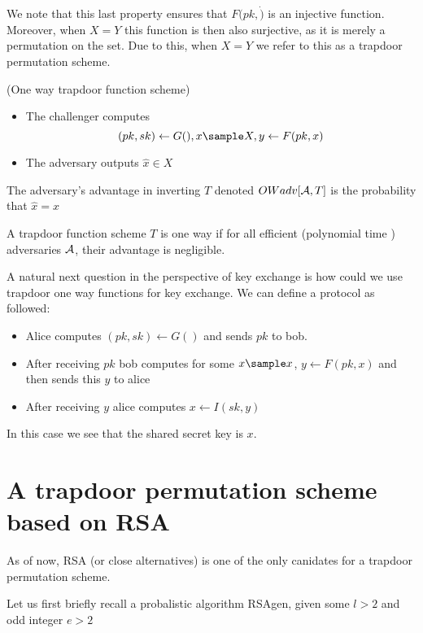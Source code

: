We note that this last property ensures that \(F(pk, \dot )\) is an injective function.  Moreover, when \(X=Y\) this function is then also surjective, as it is merely a permutation on the set. Due to this, when \(X=Y\) we refer to this as a trapdoor permutation scheme. 

\begin{attackGame} (One way trapdoor function scheme)
    \begin{itemize}
    \item The challenger computes 
    \[
        (pk, sk) \gets G(), x \sample X, y \gets F(pk, x)
    \] 
    \item The adversary outputs \(\hat{x} \in X\)
 
    \end{itemize}
    The adversary's advantage in inverting \(T\) denoted \(OWadv[\mathcal{A}, T]\) is the probability that \(\hat{x} = x\)    
\end{attackGame}

\begin{definition}
    A trapdoor function scheme \(T\) is one way if for all efficient (polynomial time ) adversaries \(\mathcal{A}\), their advantage is negligible.    
\end{definition}

A natural next question in the perspective of key exchange is how could we use trapdoor one way functions for key exchange. We can define a protocol as followed:
\begin{itemize}
    \item Alice computes \((pk, sk) \gets G()\) and sends \(pk\) to bob. 
    \item After receiving \(pk\) bob computes  for some \(x \sample x\), \(y \gets F(pk, x)\) and then sends this \(y\) to alice 
    \item After receiving \(y\) alice computes \(x \gets I(sk, y)\)       
\end{itemize}
In this case we see that the shared secret key is \(x\). 


\section{A trapdoor permutation scheme based on RSA}
  
As of now, RSA (or close alternatives) is one of the only canidates for a trapdoor permutation scheme. 

Let us first briefly recall a probalistic algorithm RSAgen, given some \(l > 2\) and odd integer \(e > 2\) 


